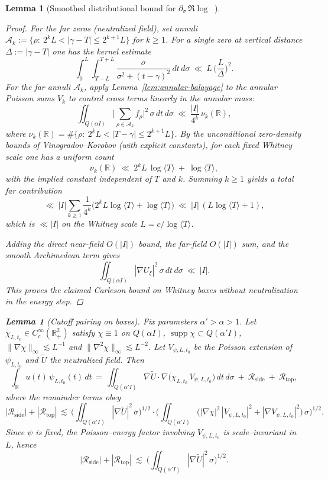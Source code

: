 \documentclass[11pt]{article}
\newtheorem{lemma}[theorem]{Lemma}
\theoremstyle{definition}
\theoremstyle{remark}
\newcommand{\R}{\mathbb{R}}
\DeclareMathOperator{\dettwo}{det_2}
\begin{document}
\begin{lemma}[Smoothed distributional bound for $\partial_\sigma\,\Re\log\dettwo$]
\begin{proof}
For the far zeros (neutralized field), set annuli $\mathcal A_k:=\{\rho:\ 2^kL<|\gamma-T|\le 2^{k+1}L\}$ for $k\ge1$. For a single zero at vertical distance $\Delta:=|\gamma-T|$ one has the kernel estimate
\[
 \int_0^{L}\!\int_{T-L}^{T+L} \frac{\sigma}{\sigma^2+(t-\gamma)^2}\,dt\,d\sigma\ \ll\ L\,\Big(\frac{L}{\Delta}\Big)^{\!2}.
\]
For the far annuli $\mathcal A_k$, apply Lemma~\ref{lem:annular-balayage} to the annular Poisson sums $V_k$ to control cross terms linearly in the annular mass:
\[
  \iint_{Q(\alpha I)}\Big|\sum_{\rho\in\mathcal A_k} f_{\rho}\Big|^2\,\sigma\,dt\,d\sigma\ \ll\ \frac{|I|}{4^k}\,\nu_k(\R),
\]
where $\nu_k(\R)=\#\{\rho:\ 2^kL<|T-\gamma|\le 2^{k+1}L\}$. By the unconditional zero-density bounds of Vinogradov--Korobov (with explicit constants), for each fixed Whitney scale one has a uniform count
\[ \nu_k(\R)\ \ll\ 2^kL\,\log\langle T\rangle\ +\ \log\langle T\rangle, \]
with the implied constant independent of $T$ and $k$.
Summing $k\ge1$ yields a total far contribution
\[ \ll\ |I|\sum_{k\ge1}\frac{1}{4^k}\big(2^kL\log\langle T\rangle+\log\langle T\rangle\big)\ \ll\ |I|\,(L\log\langle T\rangle+1), \]
which is $\ll |I|$ on the Whitney scale $L=c/\log\langle T\rangle$.

Adding the direct near-field $O(|I|)$ bound, the far-field $O(|I|)$ sum, and the smooth Archimedean term gives
\[
 \iint_{Q(\alpha I)} |\nabla U_\xi|^2\,\sigma\,dt\,d\sigma\ \ll\ |I|.
\]
This proves the claimed Carleson bound on Whitney boxes without neutralization in the energy step.
\end{proof}
\begin{lemma}[Cutoff pairing on boxes]\label{lem:cutoff-pairing}
Fix parameters $\alpha'>\alpha>1$. Let $\chi_{L,t_0}\in C_c^\infty(\R^2_+)$ satisfy $\chi\equiv1$ on $Q(\alpha I)$, $\operatorname{supp}\chi\subset Q(\alpha'I)$,
$\|\nabla\chi\|_\infty\lesssim L^{-1}$ and $\|\nabla^2\chi\|_\infty\lesssim L^{-2}$. Let $V_{\psi,L,t_0}$ be the Poisson extension of $\psi_{L,t_0}$ and $\widetilde U$ the neutralized field. Then
\[
 \int_{\R} u(t)\,\psi_{L,t_0}(t)\,dt
 \,=\, \iint_{Q(\alpha'I)} \nabla \widetilde U\cdot \nabla\big(\chi_{L,t_0}\, V_{\psi,L,t_0}\big)\,dt\,d\sigma\ +\ \mathcal R_{\mathrm{side}}\ +\ \mathcal R_{\mathrm{top}},
\]
where the remainder terms obey
\[
 |\mathcal R_{\mathrm{side}}|+|\mathcal R_{\mathrm{top}}|
 \,\lesssim\, \Big(\iint_{Q(\alpha'I)} |\nabla \widetilde U|^2\,\sigma\Big)^{1/2}
               \cdot \Big(\iint_{Q(\alpha' I)} \big(|\nabla\chi|^2\,|V_{\psi,L,t_0}|^2+|\nabla V_{\psi,L,t_0}|^2\big)\,\sigma\Big)^{1/2}.
\]
Since $\psi$ is fixed, the Poisson–energy factor involving $V_{\psi,L,t_0}$ is scale–invariant in $L$, hence
\[
 |\mathcal R_{\mathrm{side}}|+|\mathcal R_{\mathrm{top}}|\ \lesssim\ \Big(\iint_{Q(\alpha'I)} |\nabla \widetilde U|^2\,\sigma\Big)^{1/2}.
\]
\end{lemma}


\end{lemma}
\end{document}
